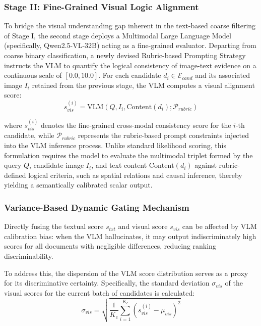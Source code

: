 \documentclass[a4paper, fleqn]{cas-dc}
\begin{document}
\subsubsection{Stage II: Fine-Grained Visual Logic Alignment}\label{sec:stage_visual_alignment}

To bridge the visual understanding gap inherent in the text-based coarse filtering of Stage I, the second stage deploys a Multimodal Large Language Model (specifically, Qwen2.5-VL-32B) acting as a fine-grained evaluator.
Departing from coarse binary classification, a newly devised Rubric-based Prompting Strategy instructs the VLM to quantify the logical consistency of image-text evidence on a continuous scale of $[0.0, 10.0]$.
For each candidate $d_i \in \mathcal{E}_{cand}$ and its associated image $I_i$ retained from the previous stage, the VLM computes a visual alignment score:
\begin{equation}
s_{vis}^{(i)} = \text{VLM}(Q, I_i, \text{Content}(d_i); \mathcal{P}_{rubric})
\label{eq:visual_score}
\end{equation}

where $s_{vis}^{(i)}$ denotes the fine-grained cross-modal consistency score for the $i$-th candidate, while $\mathcal{P}_{rubric}$ represents the rubric-based prompt constraints injected into the VLM inference process.
Unlike standard likelihood scoring, this formulation requires the model to evaluate the multimodal triplet formed by the query $Q$, candidate image $I_i$, and text content $\text{Content}(d_i)$ against rubric-defined logical criteria, such as spatial relations and causal inference, thereby yielding a semantically calibrated scalar output.
\subsubsection{Variance-Based Dynamic Gating Mechanism}\label{sec:dynamic_gating}
Directly fusing the textual score $s_{txt}$ and visual score $s_{vis}$ can be affected by VLM calibration bias: when the VLM hallucinates, it may output indiscriminately high scores for all documents with negligible differences, reducing ranking discriminability.

To address this, the dispersion of the VLM score distribution serves as a proxy for its discriminative certainty.
Specifically, the standard deviation $\sigma_{vis}$ of the visual scores for the current batch of candidates is calculated:
\begin{equation}
\sigma_{vis} = \sqrt{\frac{1}{K_c} \sum_{i=1}^{K_c} (s_{vis}^{(i)} - \mu_{vis})^2}
\label{eq:visual_dispersion}
\end{equation}
\end{document}
